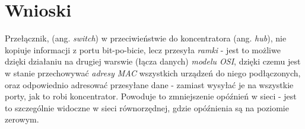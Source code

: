 \documentclass{article}
\begin{document}



\section{Wnioski}
Przełącznik, (ang. \textit{switch}) w przeciwieństwie do koncentratora (ang. \textit{hub}), nie kopiuje informacji z portu bit-po-bicie, lecz przesyła \emph{ramki} - jest to możliwe dzięki działaniu na drugiej warswie (łącza danych) \emph{modelu OSI}, dzięki czemu jest w stanie przechowywać \emph{adresy MAC} wszystkich urządzeń do niego podłączonych, oraz odpowiednio adresować przesyłane dane - zamiast wysyłać je na wszystkie porty, jak to robi koncentrator. Powoduje to zmniejszenie opóźnień w sieci - jest to szczególnie widoczne w sieci równorzędnej, gdzie opóźnienia są na poziomie zerowym.
\end{document}
